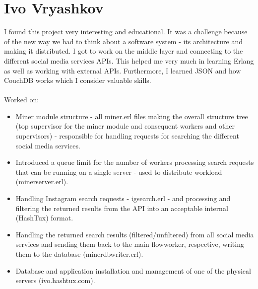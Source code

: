 \section{Ivo Vryashkov}
I found this project very interesting and educational. It was a challenge
because of the new way we had to think about a software system - its
architecture and making it distributed. I got to work on the middle layer and
connecting to the different social media services APIs. This helped me very much
in learning Erlang as well as working with external APIs. Furthermore, I learned
JSON and how CouchDB works which I consider valuable skills. \\ \\
Worked on:
\begin{itemize}
  \item Miner module structure - all miner\textunderscore *.erl files making the
        overall structure tree (top supervisor for the miner module and
        consequent workers and other supervisors) - responsible for handling
        requests for searching the different social media services.
  \item Introduced a queue limit for the number of workers processing search
        requests that can be running on a single server - used to distribute
        workload (miner\textunderscore server.erl).
  \item Handling Instagram search requests - ig\textunderscore search.erl - and
        processing and filtering the returned results from the API into an
        acceptable internal (HashTux) format.
  \item Handling the returned search results (filtered/unfiltered) from all
        social media services and sending them back to the main\textunderscore
        flow\textunderscore worker, respective, writing them to the database
        (miner\textunderscore dbwriter.erl).
  \item Database and application installation and management of one of the
        physical servers (ivo.hashtux.com).
\end{itemize}